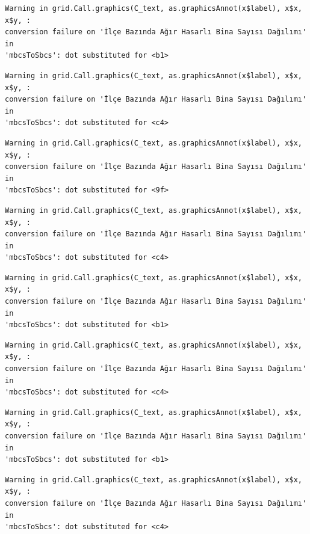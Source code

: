 \documentclass[
  11pt,
  a4paper,
  DIV=11,
  numbers=noendperiod]{scrartcl}
\begin{document}
\begin{verbatim}
Warning in grid.Call.graphics(C_text, as.graphicsAnnot(x$label), x$x, x$y, :
conversion failure on 'İlçe Bazında Ağır Hasarlı Bina Sayısı Dağılımı' in
'mbcsToSbcs': dot substituted for <b1>
\end{verbatim}

\begin{verbatim}
Warning in grid.Call.graphics(C_text, as.graphicsAnnot(x$label), x$x, x$y, :
conversion failure on 'İlçe Bazında Ağır Hasarlı Bina Sayısı Dağılımı' in
'mbcsToSbcs': dot substituted for <c4>
\end{verbatim}

\begin{verbatim}
Warning in grid.Call.graphics(C_text, as.graphicsAnnot(x$label), x$x, x$y, :
conversion failure on 'İlçe Bazında Ağır Hasarlı Bina Sayısı Dağılımı' in
'mbcsToSbcs': dot substituted for <9f>
\end{verbatim}

\begin{verbatim}
Warning in grid.Call.graphics(C_text, as.graphicsAnnot(x$label), x$x, x$y, :
conversion failure on 'İlçe Bazında Ağır Hasarlı Bina Sayısı Dağılımı' in
'mbcsToSbcs': dot substituted for <c4>
\end{verbatim}

\begin{verbatim}
Warning in grid.Call.graphics(C_text, as.graphicsAnnot(x$label), x$x, x$y, :
conversion failure on 'İlçe Bazında Ağır Hasarlı Bina Sayısı Dağılımı' in
'mbcsToSbcs': dot substituted for <b1>
\end{verbatim}

\begin{verbatim}
Warning in grid.Call.graphics(C_text, as.graphicsAnnot(x$label), x$x, x$y, :
conversion failure on 'İlçe Bazında Ağır Hasarlı Bina Sayısı Dağılımı' in
'mbcsToSbcs': dot substituted for <c4>
\end{verbatim}

\begin{verbatim}
Warning in grid.Call.graphics(C_text, as.graphicsAnnot(x$label), x$x, x$y, :
conversion failure on 'İlçe Bazında Ağır Hasarlı Bina Sayısı Dağılımı' in
'mbcsToSbcs': dot substituted for <b1>
\end{verbatim}

\begin{verbatim}
Warning in grid.Call.graphics(C_text, as.graphicsAnnot(x$label), x$x, x$y, :
conversion failure on 'İlçe Bazında Ağır Hasarlı Bina Sayısı Dağılımı' in
'mbcsToSbcs': dot substituted for <c4>
\end{verbatim}
\end{document}
